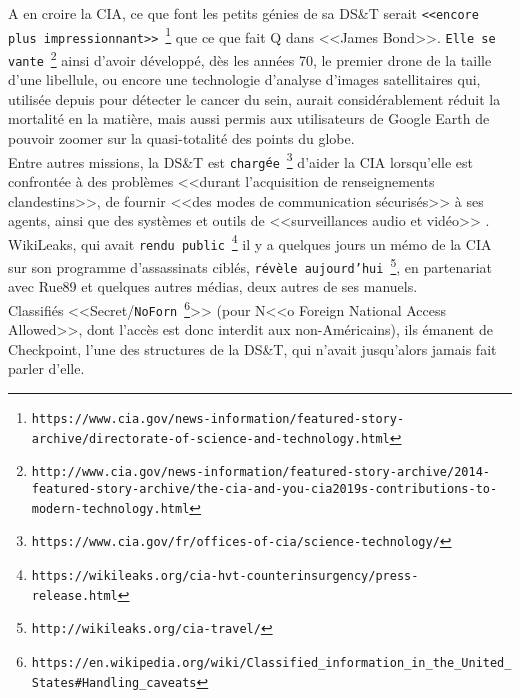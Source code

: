 \documentclass[11pt,twoside,a4paper]{article}
\begin{document}
A en croire la CIA, ce que font les petits g{\'e}nies de sa DS\&T serait \texttt{<<encore plus impressionnant>>}~\footnote{\texttt{https://www.cia.gov/news-information/featured-story-archive/directorate-of-science-and-technology.html}} que ce que fait Q dans <<James Bond>>. \texttt{Elle se vante}~\footnote{\texttt{http://www.cia.gov/news-information/featured-story-archive/2014-featured-story-archive/the-cia-and-you-cia2019s-contributions-to-modern-technology.html}} ainsi d'avoir d{\'e}velopp{\'e}, d{\`e}s les ann{\'e}es 70, le premier drone de la taille d'une libellule, ou encore une technologie d'analyse d'images satellitaires qui, utilis{\'e}e depuis pour d{\'e}tecter le cancer du sein, aurait consid{\'e}rablement r{\'e}duit la mortalit{\'e} en la mati{\`e}re, mais aussi permis aux utilisateurs de Google Earth de pouvoir zoomer sur la quasi-totalit{\'e} des points du globe. ~\\


Entre autres missions, la DS\&T est \texttt{charg{\'e}e}~\footnote{\texttt{https://www.cia.gov/fr/offices-of-cia/science-technology/}} d'aider la CIA lorsqu'elle est confront{\'e}e {\`a} des probl{\`e}mes <<durant l'acquisition de renseignements clandestins>>, de fournir <<des modes de communication s{\'e}curis{\'e}s>> {\`a} ses agents, ainsi que des syst{\`e}mes et outils de <<surveillances audio et vid{\'e}o>> . ~\\

WikiLeaks, qui avait \texttt{rendu public}~\footnote{\texttt{https://wikileaks.org/cia-hvt-counterinsurgency/press-release.html}} il y a quelques jours un m{\'e}mo de la CIA sur son programme d'assassinats cibl{\'e}s, \texttt{r{\'e}v{\`e}le aujourd'hui}~\footnote{\texttt{http://wikileaks.org/cia-travel/}}, en partenariat avec Rue89 et quelques autres m{\'e}dias, deux autres de ses manuels. ~\\

Classifi{\'e}s <<Secret/\texttt{NoForn}~\footnote{\texttt{https://en.wikipedia.org/wiki/Classified\_information\_in\_the\_United\_States\#Handling\_caveats}}>> (pour N<<o Foreign National Access Allowed>>, dont l'acc{\`e}s est donc interdit aux non-Am{\'e}ricains), ils {\'e}manent de Checkpoint, l'une des structures de la DS\&T, qui n'avait jusqu'alors jamais fait parler d'elle. ~\\

\end{document}
